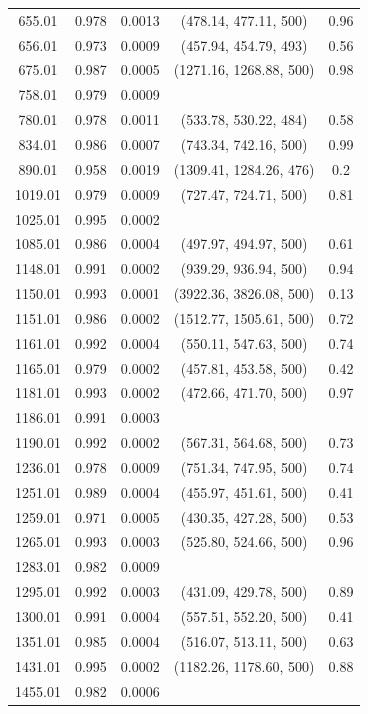 \documentclass[fleqn,usenatbib, onecolumn,dvipdfmx]{mnras}
\begin{document}
\begin{center}
\begin{tabular}{|c|c|c|c|c|}
655.01 & 0.978 & 0.0013 & (478.14, 477.11, 500) & 0.96 \\
656.01 & 0.973 & 0.0009 & (457.94, 454.79, 493) & 0.56 \\
675.01 & 0.987 & 0.0005 & (1271.16, 1268.88, 500) & 0.98 \\
758.01 & 0.979 & 0.0009 &  &  \\
780.01 & 0.978 & 0.0011 & (533.78, 530.22, 484) & 0.58 \\
834.01 & 0.986 & 0.0007 & (743.34, 742.16, 500) & 0.99 \\
890.01 & 0.958 & 0.0019 & (1309.41, 1284.26, 476) & 0.2 \\
1019.01 & 0.979 & 0.0009 & (727.47, 724.71, 500) & 0.81 \\
1025.01 & 0.995 & 0.0002 &  &  \\
1085.01 & 0.986 & 0.0004 & (497.97, 494.97, 500) & 0.61 \\
1148.01 & 0.991 & 0.0002 & (939.29, 936.94, 500) & 0.94 \\
1150.01 & 0.993 & 0.0001 & (3922.36, 3826.08, 500) & 0.13 \\
1151.01 & 0.986 & 0.0002 & (1512.77, 1505.61, 500) & 0.72 \\
1161.01 & 0.992 & 0.0004 & (550.11, 547.63, 500) & 0.74 \\
1165.01 & 0.979 & 0.0002 & (457.81, 453.58, 500) & 0.42 \\
1181.01 & 0.993 & 0.0002 & (472.66, 471.70, 500) & 0.97 \\
1186.01 & 0.991 & 0.0003 &  &  \\
1190.01 & 0.992 & 0.0002 & (567.31, 564.68, 500) & 0.73 \\
1236.01 & 0.978 & 0.0009 & (751.34, 747.95, 500) & 0.74 \\
1251.01 & 0.989 & 0.0004 & (455.97, 451.61, 500) & 0.41 \\
1259.01 & 0.971 & 0.0005 & (430.35, 427.28, 500) & 0.53 \\
1265.01 & 0.993 & 0.0003 & (525.80, 524.66, 500) & 0.96 \\
1283.01 & 0.982 & 0.0009 &  &  \\
1295.01 & 0.992 & 0.0003 & (431.09, 429.78, 500) & 0.89 \\
1300.01 & 0.991 & 0.0004 & (557.51, 552.20, 500) & 0.41 \\
1351.01 & 0.985 & 0.0004 & (516.07, 513.11, 500) & 0.63 \\
1431.01 & 0.995 & 0.0002 & (1182.26, 1178.60, 500) & 0.88 \\
1455.01 & 0.982 & 0.0006 &  &  \\

\end{tabular}
\end{center}
\end{document}
